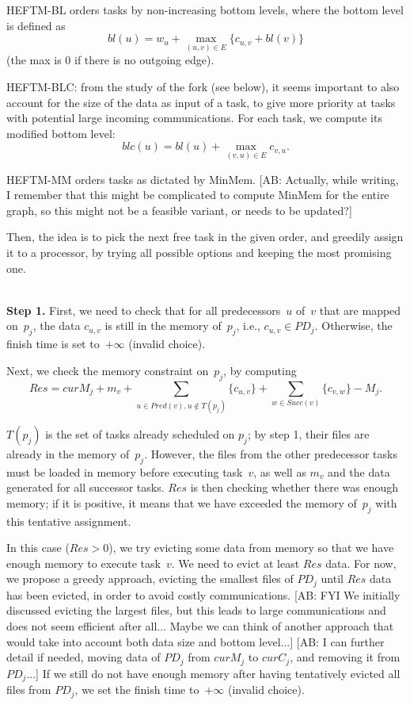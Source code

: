 \documentclass[sigconf,review,anonymous]{acmart}
\newcommand{\MM}{M}
\newcommand{\curM}{curM}
\newcommand{\curC}{curC}
\newcommand{\PD}{PD}
\newcommand{\AB}[1]{{\color{purple}[AB: #1]}}
\begin{document}
HEFTM-BL orders tasks by non-increasing bottom levels, where the bottom
level is defined as
$$bl(u) = w_u + \max_{(u,v)\in E} \{c_{u,v} + bl(v)\}$$
 (the max is 0 if there is no outgoing edge). 
 
 
 HEFTM-BLC: from the study of the fork (see below), it seems important
 to also account for the size of the data as input of a task,
 to give more priority at tasks with potential large incoming communications.
 For each task, we compute its modified bottom level: 
 $$blc(u) = bl(u) + \max_{(v,u)\in E} c_{v,u}   . $$
 
 
HEFTM-MM orders tasks as dictated by MinMem.
\AB{Actually, while writing,
I remember that this might be complicated to compute MinMem for the
entire graph, so this might not be a feasible variant, or needs to be updated?}


Then, the idea is to pick the next free task in the given order,
and greedily assign it to a processor, by trying all possible options
and keeping the most promising one. 

\medskip
{}\\
{\bf Step 1.} First, we need to check that for all predecessors~$u$ of~$v$ that are mapped
on~$p_j$, the data $c_{u,v}$ is still in the memory of~$p_j$, 
i.e., $c_{u,v}\in PD_j$. Otherwise, the finish time is set to~$+\infty$ (invalid choice). 

\smallskip
{} Next, we check the memory constraint on~$p_j$, by computing
$$Res = \curM_j  + m_v + \sum_{u \in Pred(v), u\notin T(p_j)}  \{c_{u,v}\}
+ \sum_{w\in Succ(v)}  \{c_{v,w}\} - \MM_j .$$

$T(p_j)$ is the set of tasks already scheduled on $p_j$; by step 1, their files are
already in the memory of~$p_j$. However, the files from the 
other predecessor tasks must be loaded in memory before executing task~$v$,
as well as $m_v$ and the data generated for all successor tasks.
$Res$ is then checking whether there was enough memory; if it is positive, 
it means that we have exceeded the memory of~$p_j$ with this tentative 
assignment. 

In this case ($Res >0$), we  try evicting
some data from memory so that we have enough memory to execute task~$v$. 
We need to evict at least $Res$ data. For now, we propose a greedy approach,
evicting the smallest files of $\PD_j$ until $Res$ data has been evicted,
in order to avoid costly communications. 
\AB{FYI We initially discussed  evicting the largest files, but this leads to 
large communications and does not seem efficient after all... Maybe we can think of another 
approach that would take into account both data size and bottom level...}
\AB{I can further detail if needed, moving data of $\PD_j$ from $\curM_j$
to $\curC_j$, and removing it from $\PD_j$...}
If we still do not have enough memory after having tentatively evicted all files from $\PD_j$,
we set the finish time to~$+\infty$ (invalid choice). 
\end{document}
